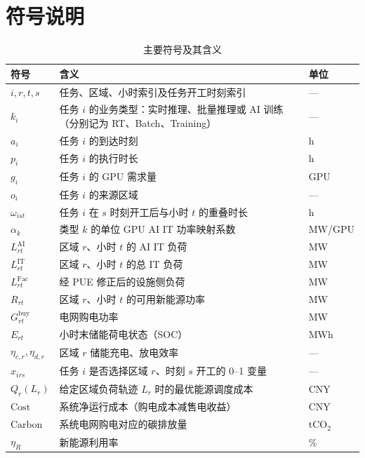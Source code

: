 \section{符号说明}

\begingroup
{}
\setlength{\extrarowheight}{2pt}
\begin{table}[!htbp]
\centering
\caption{主要符号及其含义}
\label{tab:notation-main}
\small
\begin{tabularx}{0.97\textwidth}{>{\centering\arraybackslash}p{2.5cm}X>{\centering\arraybackslash}p{2.2cm}}
\toprule
\rowcolor{CumcmLightBlue}
\textbf{符号} & \textbf{含义} & \textbf{单位} \\
\midrule
$i,r,t,s$ & 任务、区域、小时索引及任务开工时刻索引 & --- \\
$k_i$ & 任务 $i$ 的业务类型：实时推理、批量推理或 AI 训练（分别记为 RT、Batch、Training） & --- \\
$a_i$ & 任务 $i$ 的到达时刻 & h \\
$p_i$ & 任务 $i$ 的执行时长 & h \\
$g_i$ & 任务 $i$ 的 GPU 需求量 & GPU \\
$o_i$ & 任务 $i$ 的来源区域 & --- \\
$\omega_{ist}$ & 任务 $i$ 在 $s$ 时刻开工后与小时 $t$ 的重叠时长 & h \\
$\alpha_k$ & 类型 $k$ 的单位 GPU AI IT 功率映射系数 & MW/GPU \\
$L^{\mathrm{AI}}_{rt}$ & 区域 $r$、小时 $t$ 的 AI IT 负荷 & MW \\
$L^{\mathrm{IT}}_{rt}$ & 区域 $r$、小时 $t$ 的总 IT 负荷 & MW \\
$L^{\mathrm{Fac}}_{rt}$ & 经 PUE 修正后的设施侧负荷 & MW \\
$R_{rt}$ & 区域 $r$、小时 $t$ 的可用新能源功率 & MW \\
$G^{\mathrm{buy}}_{rt}$ & 电网购电功率 & MW \\
$E_{rt}$ & 小时末储能荷电状态（SOC） & MWh \\
$\eta_{c,r},\eta_{d,r}$ & 区域 $r$ 储能充电、放电效率 & --- \\
$x_{irs}$ & 任务 $i$ 是否选择区域 $r$、时刻 $s$ 开工的 0--1 变量 & --- \\
$Q_r(L_r)$ & 给定区域负荷轨迹 $L_r$ 时的最优能源调度成本 & CNY \\
$\mathrm{Cost}$ & 系统净运行成本（购电成本减售电收益） & CNY \\
$\mathrm{Carbon}$ & 系统电网购电对应的碳排放量 & tCO$_2$ \\
$\eta_R$ & 新能源利用率 & \% \\
\bottomrule
\end{tabularx}
\end{table}

\endgroup
